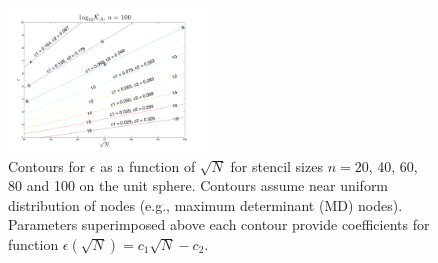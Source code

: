 \documentclass[11pt]{report}
\begin{document}
{\begin{figure}[htbp]
\includegraphics[width=0.475\textwidth]{../figures/chapter2/epsilon_contours/labeled_contour_n100.pdf}
\caption{Contours for $\epsilon$ as a function of $\sqrt{N}$ for stencil sizes $n=20$, 40, 60, 80 and 100 on the unit sphere. Contours assume near uniform distribution of nodes (e.g., maximum determinant (MD) nodes). Parameters superimposed above each contour provide coefficients for function $\epsilon(\sqrt{N}) = c_{1} \sqrt{N} - c_{2}$. }
\label{fig:epsilon_contours}
\end{figure}



%
%
%





}

%
%

\ifstandalone


\end{document}
